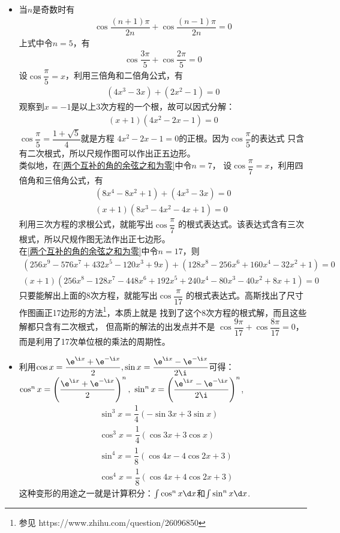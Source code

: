 \begin{itemize}[leftmargin=\inteval{\myitemleftmargin}pt,itemsep=
   \inteval{\myitemitempsep}pt,topsep=\inteval{\myitemtopsep}pt]
\item 当$ n $是奇数时有
\begin{gather}\label{两个互补的角的余弦之和为零}
    \cos\dfrac{(n+1)\pi}{2n}+\cos\dfrac{(n-1)\pi}{2n}=0
\end{gather}
上式中令$ n=5 $，有
\begin{gather*}
    \cos\dfrac{3\pi}{5}+\cos\dfrac{2\pi}{5}=0
\end{gather*}
设$ \cos\dfrac{\pi}{5}=x $，利用三倍角和二倍角公式，有
\begin{gather*}
    (4x^3-3x)+(2x^2-1)=0
\end{gather*}
观察到$ x=-1 $是以上3次方程的一个根，故可以因式分解：
\begin{gather*}
    (x+1)(4x^2-2x-1)=0
\end{gather*}
$ \cos\dfrac{\pi}{5}=\dfrac{1+\sqrt{5}}{4} $就是方程
$ 4 x^2-2x-1=0 $的正根。因为$ \cos\dfrac{\pi}{5} $的表达式
只含有二次根式，所以尺规作图可以作出正五边形。\\
类似地，在\eqref{两个互补的角的余弦之和为零}中令$ n=7 $，
设$ \cos\dfrac{\pi}{7}=x $，利用四倍角和三倍角公式，有
\begin{gather*}
    (8x^4-8x^2+1)+(4x^3-3x)=0 \\
    (x+1)(8x^3-4x^2-4x+1)=0
\end{gather*}
利用三次方程的求根公式，就能写出$ \cos\dfrac{\pi}{7} $
的根式表达式。该表达式含有三次根式，所以尺规作图无法作出正七边形。\\
在\eqref{两个互补的角的余弦之和为零}中令$ n=17 $，则
\begin{gather*}
    (256x^9-576x^7+432x^5-120x^3+9x)+(128x^8-256x^6+160x^4-32x^2+1)=0\\
    (x+1)(256x^8-128x^7-448x^6+192x^5+240x^4-80x^3-40x^2+8x+1)=0
\end{gather*}
只要能解出上面的8次方程，就能写出$ \cos\dfrac{\pi}{17} $
的根式表达式。高斯找出了尺寸作图画正17边形的方法\footnote{参见
    https://www.zhihu.com/question/26096850}，本质上就是
找到了这个8次方程的根式解，而且这些解都只含有二次根式，
但高斯的解法的出发点并不是
$ \cos\dfrac{9\pi}{17}+\cos\dfrac{8\pi}{17}=0 $，
而是利用了17次单位根的乘法的周期性。

\item 利用$ \cos x=\dfrac{\e^{\i x}+\e^{-\i x}}{2},
\sin x=\dfrac{\e^{\i x}-\e^{-\i x}}{2\i} $可得：$
\cos^n x=\left( \dfrac{\e^{\i x}+\e^{-\i x}}{2}\right)^n,\ 
\sin^n x=\left(\dfrac{\e^{\i x}-\e^{-\i x}}{2\i}\right)^n $,
\begin{align*}
    &  \sin^3 x=\dfrac{1}{4}(-\sin3x+3\sin x)  \\
    &  \cos^3 x=\dfrac{1}{4}( \cos3x+3\cos x)	\\
    &  \sin^4 x=\dfrac{1}{8}(\cos 4x-4\cos 2x+3)  \\
    &  \cos^4 x=\dfrac{1}{8}(\cos 4x+4\cos 2x+3) 
\end{align*}
这种变形的用途之一就是计算积分：$ \int \cos^n x \d x $和$ \int \sin^n x \d x $. 

\end{itemize}

